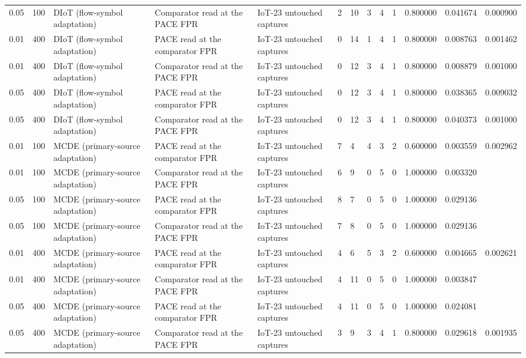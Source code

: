 \begin{tabular}{lllllllllllll}
0.05 & 100 & DIoT (flow-symbol adaptation) & Comparator read at the PACE FPR & IoT-23 untouched captures & 2 & 10 & 3 & 4 & 1 & 0.800000 & 0.041674 & 0.000900 \\
0.01 & 400 & DIoT (flow-symbol adaptation) & PACE read at the comparator FPR & IoT-23 untouched captures & 0 & 14 & 1 & 4 & 1 & 0.800000 & 0.008763 & 0.001462 \\
0.01 & 400 & DIoT (flow-symbol adaptation) & Comparator read at the PACE FPR & IoT-23 untouched captures & 0 & 12 & 3 & 4 & 1 & 0.800000 & 0.008879 & 0.001000 \\
0.05 & 400 & DIoT (flow-symbol adaptation) & PACE read at the comparator FPR & IoT-23 untouched captures & 0 & 12 & 3 & 4 & 1 & 0.800000 & 0.038365 & 0.009032 \\
0.05 & 400 & DIoT (flow-symbol adaptation) & Comparator read at the PACE FPR & IoT-23 untouched captures & 0 & 12 & 3 & 4 & 1 & 0.800000 & 0.040373 & 0.001000 \\
0.01 & 100 & MCDE (primary-source adaptation) & PACE read at the comparator FPR & IoT-23 untouched captures & 7 & 4 & 4 & 3 & 2 & 0.600000 & 0.003559 & 0.002962 \\
0.01 & 100 & MCDE (primary-source adaptation) & Comparator read at the PACE FPR & IoT-23 untouched captures & 6 & 9 & 0 & 5 & 0 & 1.000000 & 0.003320 &  \\
0.05 & 100 & MCDE (primary-source adaptation) & PACE read at the comparator FPR & IoT-23 untouched captures & 8 & 7 & 0 & 5 & 0 & 1.000000 & 0.029136 &  \\
0.05 & 100 & MCDE (primary-source adaptation) & Comparator read at the PACE FPR & IoT-23 untouched captures & 7 & 8 & 0 & 5 & 0 & 1.000000 & 0.029136 &  \\
0.01 & 400 & MCDE (primary-source adaptation) & PACE read at the comparator FPR & IoT-23 untouched captures & 4 & 6 & 5 & 3 & 2 & 0.600000 & 0.004665 & 0.002621 \\
0.01 & 400 & MCDE (primary-source adaptation) & Comparator read at the PACE FPR & IoT-23 untouched captures & 4 & 11 & 0 & 5 & 0 & 1.000000 & 0.003847 &  \\
0.05 & 400 & MCDE (primary-source adaptation) & PACE read at the comparator FPR & IoT-23 untouched captures & 4 & 11 & 0 & 5 & 0 & 1.000000 & 0.024081 &  \\
0.05 & 400 & MCDE (primary-source adaptation) & Comparator read at the PACE FPR & IoT-23 untouched captures & 3 & 9 & 3 & 4 & 1 & 0.800000 & 0.029618 & 0.001935 \\
\bottomrule
\end{tabular}
